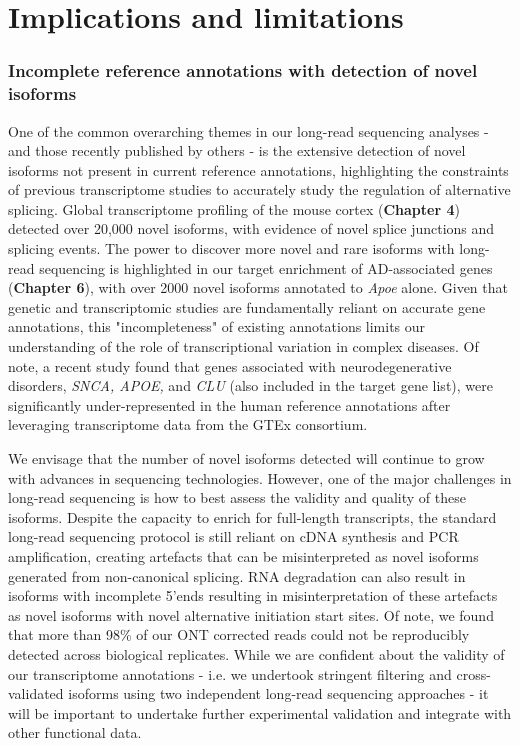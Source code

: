 \section{Implications and limitations}

\subsubsection{Incomplete reference annotations with detection of novel isoforms} 
One of the common overarching themes in our long-read sequencing analyses - and those recently published by others - is the extensive detection of novel isoforms not present in current reference annotations, highlighting the constraints of previous transcriptome studies to accurately study the regulation of alternative splicing. Global transcriptome profiling of the mouse cortex (\textbf{Chapter 4}) detected over 20,000 novel isoforms, with evidence of novel splice junctions and splicing events. The power to discover more novel and rare isoforms with long-read sequencing is highlighted in our target enrichment of AD-associated genes (\textbf{Chapter 6}), with over 2000 novel isoforms annotated to \textit{Apoe} alone. Given that genetic and transcriptomic studies are fundamentally reliant on accurate gene annotations, this "incompleteness" of existing annotations limits our understanding of the role of transcriptional variation in complex diseases. Of note, a recent study found that genes associated with neurodegenerative disorders, \textit{SNCA, APOE,} and \textit{CLU} (also included in the target gene list), were significantly under-represented in the human reference annotations after leveraging transcriptome data from the GTEx consortium.  

We envisage that the number of novel isoforms detected will continue to grow with advances in sequencing technologies. However, one of the major challenges in long-read sequencing is how to best assess the validity and quality of these isoforms. Despite the capacity to enrich for full-length transcripts, the standard long-read sequencing protocol is still reliant on cDNA synthesis and PCR amplification, creating artefacts that can be misinterpreted as novel isoforms generated from non-canonical splicing. RNA degradation can also result in isoforms with incomplete 5'ends resulting in misinterpretation of these artefacts as novel isoforms with novel alternative initiation start sites. Of note, we found that more than 98\% of our ONT corrected reads could not be reproducibly detected across biological replicates. While we are confident about the validity of our transcriptome annotations - i.e. we undertook stringent filtering and cross-validated isoforms using two independent long-read sequencing approaches - it will be important to undertake further experimental validation and integrate with other functional data. 

